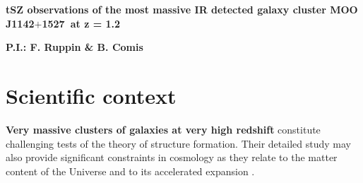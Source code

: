 \documentclass[11pt,a4paper,twoside,graphicx,color]{article}
\begin{document}
\def\moo{MOO\,J1142$+$1527}
%
%
\begin{center}{\huge \bf
tSZ observations of the most massive IR detected galaxy cluster \moo\ at z = 1.2
}\end{center}
% 
\centerline{\bf P.I.: F. Ruppin \& B. Comis}

\section{Scientific context}
\textbf{Very massive clusters of galaxies at very high redshift} constitute challenging tests of the theory of structure formation. Their detailed study may also provide significant constraints in cosmology as they relate to the matter content of the Universe and to its accelerated expansion \cite{vik09}.
\end{document}
